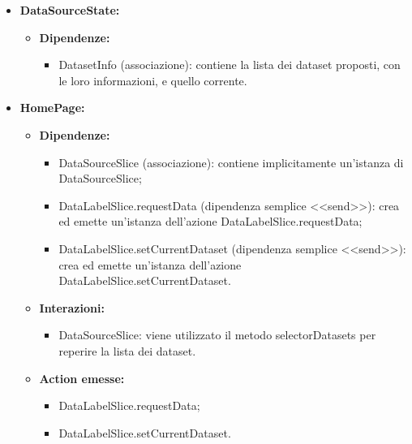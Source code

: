 \begin{itemize}
    \item \textbf{DataSourceState:}
          \begin{itemize}
              \item \textbf{Dipendenze:}
                    \begin{itemize}
                        \item DatasetInfo (associazione): contiene la lista dei dataset proposti, con le loro
                              informazioni, e quello corrente.
                    \end{itemize}
          \end{itemize}

    \item \textbf{HomePage:}
          \begin{itemize}
              \item \textbf{Dipendenze:}
                    \begin{itemize}
                        \item DataSourceSlice (associazione): contiene implicitamente un'istanza di
                              DataSourceSlice;
                        \item DataLabelSlice.requestData (dipendenza semplice <<send>>): crea ed emette
                              un'istanza dell'azione DataLabelSlice.requestData;
                        \item DataLabelSlice.setCurrentDataset (dipendenza semplice <<send>>): crea ed emette
                              un'istanza dell'azione DataLabelSlice.setCurrentDataset.
                    \end{itemize}
              \item \textbf{Interazioni:}
                    \begin{itemize}
                        \item DataSourceSlice: viene utilizzato il metodo selectorDatasets per reperire la
                              lista dei dataset.
                    \end{itemize}
              \item \textbf{Action emesse:}
                    \begin{itemize}
                        \item DataLabelSlice.requestData;
                        \item DataLabelSlice.setCurrentDataset.
                    \end{itemize}
          \end{itemize}


\end{itemize}

